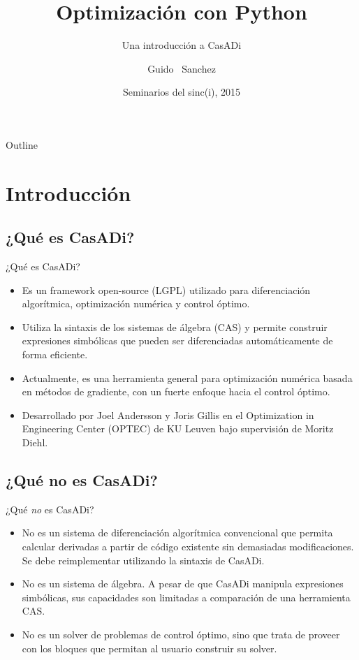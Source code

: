 \documentclass{beamer}
\title{Optimización con Python}
\subtitle{Una introducción a CasADi}
\author{Guido ~Sanchez}
\institute[sinc(i)] %
{
  Centro de Investigación en Señales, Sistemas e Inteligencia Computacional \\
  Universidad Nacional del Litoral
}
\date{Seminarios del sinc(i), 2015}
\begin{document}
\begin{frame}
  \titlepage
\end{frame}

\begin{frame}{Outline}
  \tableofcontents
\end{frame}


\section{Introducción}

\subsection{¿Qué es CasADi?}

\begin{frame}{¿Qué es CasADi?}{}
  \begin{itemize}
  \item Es un framework open-source (LGPL) utilizado para diferenciación algorítmica, optimización numérica y control óptimo.
  \item Utiliza la sintaxis de los sistemas de álgebra (CAS) y permite construir expresiones simbólicas que pueden ser diferenciadas automáticamente de forma eficiente.
  \item Actualmente, es una herramienta general para optimización numérica basada en métodos de gradiente, con un fuerte enfoque hacia el control óptimo.
  \item Desarrollado por Joel Andersson y Joris Gillis en el Optimization in Engineering Center (OPTEC) de KU Leuven bajo supervisión de Moritz Diehl.
  \end{itemize}
\end{frame}

\subsection{¿Qué no es CasADi?}

\begin{frame}{¿Qué \textit{no} es CasADi?}
  \begin{itemize}
  \item No es un sistema de diferenciación algorítmica convencional que permita calcular derivadas a partir de código existente sin demasiadas modificaciones. Se debe reimplementar utilizando la sintaxis de CasADi.
  \item No es un sistema de álgebra. A pesar de que CasADi manipula expresiones simbólicas, sus capacidades son limitadas a comparación de una herramienta CAS.
  \item No es un solver de problemas de control óptimo, sino que trata de proveer con los bloques que permitan al usuario construir su solver.
  \end{itemize}
\end{frame}
\end{document}
